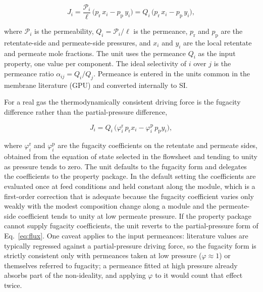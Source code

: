 \documentclass[a4paper,fleqn]{cas-dc}
\begin{document}
\begin{equation}\label{eq:flux}
J_i = \frac{\mathcal{P}_i}{\ell}\,\bigl(p_\mathrm{r}\,x_i - p_\mathrm{p}\,y_i\bigr)
    = Q_i\,\bigl(p_\mathrm{r}\,x_i - p_\mathrm{p}\,y_i\bigr),
\end{equation}

where $\mathcal{P}_i$ is the permeability, $Q_i = \mathcal{P}_i/\ell$ is the
permeance, $p_\mathrm{r}$ and $p_\mathrm{p}$ are the retentate-side and
permeate-side pressures, and $x_i$ and $y_i$ are the local retentate and
permeate mole fractions. The unit uses the permeance $Q_i$ as the input property,
one value per component. The ideal selectivity of $i$ over $j$ is the permeance
ratio $\alpha_{ij} = Q_i/Q_j$. Permeance is entered in the units common in the
membrane literature (GPU) and converted internally to SI.

For a real gas the thermodynamically consistent driving force is the fugacity
difference rather than the partial-pressure difference,

\begin{equation}\label{eq:flux-fug}
J_i = Q_i\,\bigl(\varphi_i^{\mathrm{r}}\,p_\mathrm{r} x_i
                 - \varphi_i^{\mathrm{p}}\,p_\mathrm{p} y_i\bigr),
\end{equation}

where $\varphi_i^{\mathrm{r}}$ and $\varphi_i^{\mathrm{p}}$ are the fugacity
coefficients on the retentate and permeate sides, obtained from the equation of
state selected in the flowsheet and tending to unity as pressure tends to zero.
The unit defaults to the fugacity form and delegates the coefficients to the
property package. In the default setting the coefficients are evaluated once at
feed conditions and held constant along the module, which is a first-order
correction that is adequate because the fugacity coefficient varies only weakly
with the modest composition change along a module and the permeate-side
coefficient tends to unity at low permeate pressure. If the property package
cannot supply fugacity coefficients, the unit reverts to the partial-pressure
form of Eq.~\eqref{eq:flux}. One caveat applies to the input permeances:
literature values are typically regressed against a partial-pressure driving
force, so the fugacity form is strictly consistent only with permeances taken at
low pressure ($\varphi \approx 1$) or themselves referred to fugacity; a permeance
fitted at high pressure already absorbs part of the non-ideality, and applying
$\varphi$ to it would count that effect twice.
\end{document}
